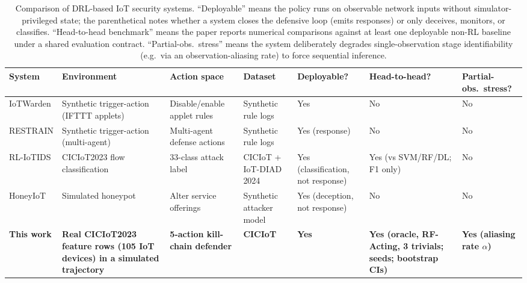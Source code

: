 \begin{table}[!htbp]
\centering
\caption[Comparison of DRL-based IoT security systems.]{Comparison of DRL-based IoT security systems. ``Deployable'' means the policy runs on observable network inputs without simulator-privileged state; the parenthetical notes whether a system closes the defensive loop (emits responses) or only deceives, monitors, or classifies. ``Head-to-head benchmark'' means the paper reports numerical comparisons against at least one deployable non-RL baseline under a shared evaluation contract. ``Partial-obs.\ stress'' means the system deliberately degrades single-observation stage identifiability (e.g.\ via an observation-aliasing rate) to force sequential inference.}
\label{tab:related_work_comparison}
\footnotesize
\setlength{\tabcolsep}{4pt}
\renewcommand{\arraystretch}{1.15}
\begin{tabularx}{\textwidth}{@{}>{\raggedright\arraybackslash}p{1.6cm} Y Y Y Y Y Y@{}}
\toprule
\textbf{System} & \textbf{Environ\-ment} & \textbf{Action space} & \textbf{Dataset} & \textbf{Deployable?} & \textbf{Head-to-head?} & \textbf{Partial-obs.\ stress?} \\
\midrule
IoT\-Warden \cite{Alam2024} & Synthetic trigger-action (IFTTT applets) & Disable\slash\allowbreak enable applet rules & Synthetic rule logs & Yes & No & No \\
\addlinespace
RE\-STRAIN \cite{Alam2025} & Synthetic trigger-action (multi-agent) & Multi-agent defense actions & Synthetic rule logs & Yes (response) & No & No \\
\addlinespace
RL-IoTIDS \cite{Odeh2026} & CICIoT2023 flow classification & 33-class attack label & CIC\-IoT + IoT-DIAD 2024 & Yes (classification, not response) & Yes (vs SVM\slash\allowbreak RF\slash\allowbreak DL; F1 only) & No \\
\addlinespace
HoneyIoT \cite{Guan2023} & Simulated honeypot & Alter service offerings & Synthetic attacker model & Yes (deception, not response) & No & No \\
\addlinespace
\textbf{This work} & \textbf{Real CICIoT2023 feature rows (105 IoT devices) in a simulated trajectory} & \textbf{5-action kill-chain defender} & \textbf{CIC\-IoT \cite{Neto2023}} & \textbf{Yes} & \textbf{Yes (oracle, RF-Acting, 3 trivials; \NumSeeds{} seeds; bootstrap CIs)} & \textbf{Yes (aliasing rate $\alpha$)} \\
\bottomrule
\end{tabularx}
\end{table}

